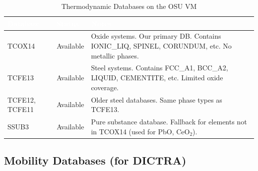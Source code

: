 \documentclass[11pt]{article}
\begin{document}
\begin{table}[H]
\caption{Thermodynamic Databases on the OSU VM}
\label{tab:thermo_dbs}
\centering
\renewcommand{\arraystretch}{1.2}
\begin{tabular}{|l|l|p{3in}|}
\hline
\rowcolor{headercolor}
\textcolor{white}{\textbf{Database}} & \textcolor{white}{\textbf{Status}} & \textcolor{white}{\textbf{Notes}} \\
\hline
TCOX14 & Available & Oxide systems. Our primary DB. Contains IONIC\_LIQ, SPINEL, CORUNDUM, etc. No metallic phases. \\
\hline
\rowcolor{altrow}
TCFE13 & Available & Steel systems. Contains FCC\_A1, BCC\_A2, LIQUID, CEMENTITE, etc. Limited oxide coverage. \\
\hline
TCFE12, TCFE11 & Available & Older steel databases. Same phase types as TCFE13. \\
\hline
\rowcolor{altrow}
SSUB3 & Available & Pure substance database. Fallback for elements not in TCOX14 (used for PbO, CeO$_2$). \\
\hline
\end{tabular}
\end{table}

\subsection{Mobility Databases (for DICTRA)}
\end{document}
